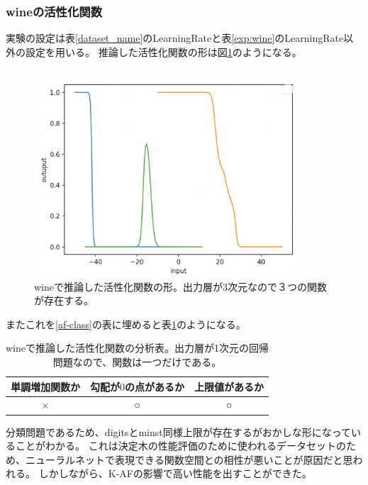 \subsubsection{wineの活性化関数}
実験の設定は表\ref{dataset_name}のLearningRateと表\ref{exp:wine}のLearningRate以外の設定を用いる。
推論した活性化関数の形は図\ref{infer_wine}のようになる。
\begin{figure}[hbtp]
    \begin{center}
        \includegraphics[width=10cm]{asset/wine-0.01.png}
            \caption{wineで推論した活性化関数の形。出力層が3次元なので３つの関数が存在する。}
            \label{infer_wine}
    \end{center}
\end{figure}

またこれを\ref{af-class}の表に埋めると表\ref{anal_wine}のようになる。
\begin{table}[htbp]
    \begin{center}
        \caption{wineで推論した活性化関数の分析表。出力層が1次元の回帰問題なので、関数は一つだけである。}
        \label{anal_wine}
        \vspace{2mm} 
        \begin{tabular}{ |c|c|c| }
        \hline
        単調増加関数か & 勾配が$ 0 $の点があるか & 上限値があるか   \\
        \hline
        × & ○ & ○   \\
        \hline
        \end{tabular}
    \end{center}
\end{table}


分類問題であるため、digitsとminst同様上限が存在するがおかしな形になっていることがわかる。
これは決定木の性能評価のために使われるデータセットのため、ニューラルネットで表現できる関数空間との相性が悪いことが原因だと思われる。
しかしながら、K-AFの影響で高い性能を出すことができた。






